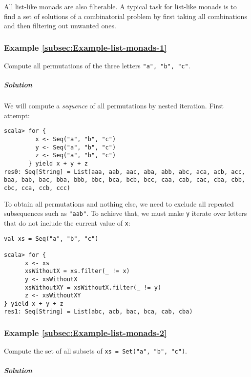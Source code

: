 All list-like monads are also filterable. A typical task for list-like
monads is to find a set of solutions of a combinatorial problem by
first taking all combinations and then filtering out unwanted ones.

\subsubsection{Example \label{subsec:Example-list-monads-1}\ref{subsec:Example-list-monads-1}}

Compute all permutations of the three letters \lstinline!"a", "b", "c"!. 

\subparagraph{Solution}

We will compute a \emph{sequence} of all permutations by nested iteration.
First attempt:
\begin{lstlisting}
scala> for {
         x <- Seq("a", "b", "c")
         y <- Seq("a", "b", "c")
         z <- Seq("a", "b", "c")
       } yield x + y + z
res0: Seq[String] = List(aaa, aab, aac, aba, abb, abc, aca, acb, acc, baa, bab, bac, bba, bbb, bbc, bca, bcb, bcc, caa, cab, cac, cba, cbb, cbc, cca, ccb, ccc)
\end{lstlisting}
To obtain all permutations and nothing else, we need to exclude all
repeated subsequences such as \lstinline!"aab"!. To achieve that,
we must make \lstinline!y! iterate over letters that do not include
the current value of \lstinline!x!:
\begin{lstlisting}
val xs = Seq("a", "b", "c")

scala> for {
      x <- xs
      xsWithoutX = xs.filter(_ != x)
      y <- xsWithoutX
      xsWithoutXY = xsWithoutX.filter(_ != y)
      z <- xsWithoutXY
} yield x + y + z
res1: Seq[String] = List(abc, acb, bac, bca, cab, cba) 
\end{lstlisting}


\subsubsection{Example \label{subsec:Example-list-monads-2}\ref{subsec:Example-list-monads-2}}

Compute the set of all subsets of \lstinline!xs = Set("a", "b", "c")!. 

\subparagraph{Solution}

